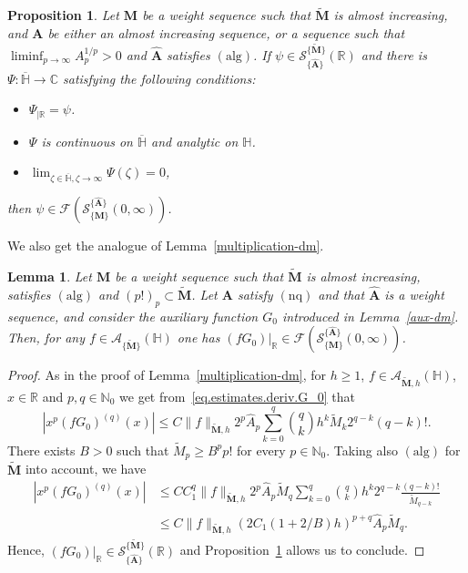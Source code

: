\documentclass[12pt,a4paper]{article}
\newcommand{\N}{\mathbb{N}}
\newcommand{\R}{\mathbb{R}}
\newcommand{\C}{\mathbb{C}}
\newcommand{\HH}{\mathbb{H}}
\newcommand{\M}{{\boldsymbol{M}}}
\newcommand{\A}{{\boldsymbol{A}}}
\newcommand{\hA}{\widehat{{\boldsymbol{A}}}}
\newcommand{\alg}{\operatorname{(alg)}}
\newcommand{\nq}{\operatorname{(nq)}}
\theoremstyle{plain}
\newtheorem{proposition}[theorem]{Proposition}
\newtheorem{lemma}[theorem]{Lemma}
\theoremstyle{definition}
\numberwithin{equation}{section}
\begin{document}
\begin{proposition}\label{Fourier-image-without-sm} Let $\M$ be a weight sequence such that $\widetilde{\M}$ is almost increasing, and $\A$ be either an almost increasing sequence, or a sequence such that $\liminf_{p\to\infty}A_p^{1/p}>0$ and $\hA$ satisfies $\alg$. If $\psi \in \mathcal{S}^{\{\widetilde{\M}\}}_{\{\hA\}}(\R)$ and there is $\Psi: \overline{\HH} \rightarrow \C$ satisfying the following conditions:
\begin{itemize}
\item[$(i)$] $\Psi_{|\R} = \psi$.
\item[$(ii)$] $\Psi$ is continuous on $\overline{\HH}$ and analytic on $\HH$.
\item[$(iii)$] $\lim_{\zeta \in \overline{\HH}, \zeta \to \infty} \Psi(\zeta) = 0$,
\end{itemize}
then $\psi \in \mathcal{F}(\mathcal{S}^{\{\hA\}}_{\{\M\}}(0,\infty))$.
\end{proposition}

We also get the analogue of Lemma~\ref{multiplication-dm}.

\begin{lemma}\label{multiplication-without-sm}
Let $\M$ be a weight sequence such that $\widetilde{\M}$ is almost increasing, satisfies $\alg$ and $(p!)_p\subset \widetilde{\M}$. Let $\A$ satisfy $\nq$ and that $\hA$ is a weight sequence, and consider the auxiliary function $G_0$ introduced in Lemma~\ref{aux-dm}.
Then, for any
$f\in\mathcal{A}_{\{\widetilde{\M}\}}(\HH)$ one has $(fG_0)|_{\R} \in \mathcal{F}(\mathcal{S}^{\{\hA\}}_{\{\M\}}(0,\infty))$.
\end{lemma}

\begin{proof}
As in the proof of Lemma~\ref{multiplication-dm}, for $h\ge 1$, $f \in \mathcal{A}_{\widetilde{\M},h}(\HH)$, $x\in\R$ and $p,q\in\N_0$ we get from~\eqref{eq.estimates.deriv.G_0} that
\begin{equation*}
|x^p(fG_0)^{(q)}(x)|
\le C\|f\|_{\widetilde{\M},h}2^p\widehat{A}_p \sum_{k=0}^q\binom{q}{k}h^k\widetilde{M}_{k}2^{q-k}(q-k)!.
\end{equation*}
There exists $B>0$ such that $\widetilde{M}_p\ge B^pp!$ for every $p\in\N_0$. Taking also $\alg$ for $\widetilde{\M}$ into account, we have
\begin{align*}
|x^p(fG_0)^{(q)}(x)|&\le
CC_1^q\|f\|_{\widetilde{\M},h}2^p\widehat{A}_p\widetilde{M}_{q} \sum_{k=0}^q\binom{q}{k}h^k2^{q-k}\frac{(q-k)!}{\widetilde{M}_{q-k}}\\
&\le C\|f\|_{\widetilde{\M},h}\left(2C_1(1+2/B)h\right)^{p+q} \widehat{A}_p\widetilde{M}_{q}.
\end{align*}
Hence,  $(fG_0)|_{\R} \in \mathcal{S}_{\{\hA\}}^{\{\widetilde{\M}\}}(\R)$ and Proposition~\ref{Fourier-image-without-sm} allows us to conclude.
\end{proof}
\end{document}
